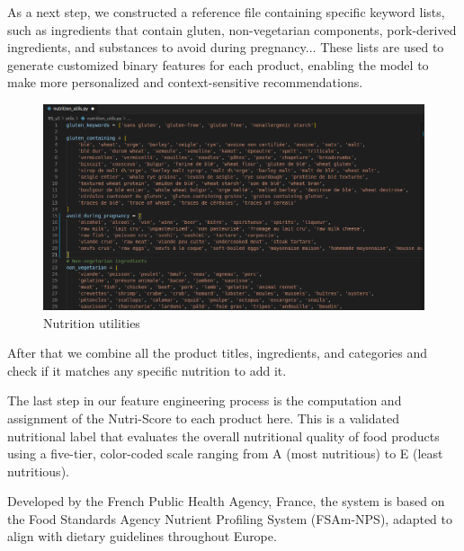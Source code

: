 As a next step, we constructed a reference file containing specific keyword lists, such as ingredients that contain gluten, non-vegetarian components, pork-derived ingredients, and substances to avoid during pregnancy... 
These lists are used to generate customized binary features for each product, enabling the model to make more personalized and context-sensitive recommendations.
\begin{center}
\begin{figure}[H]
    \includegraphics[scale=0.35]{images/nutrition_utils.png}
    \caption{Nutrition utilities} 
    \label{fig:nutrition_utils_file}
\end{figure}
\end{center}

After that we combine all the product titles, ingredients, and categories and check if it matches any specific nutrition to add it.


The last step in our feature engineering process is the computation and assignment of the Nutri-Score to each product here. This is a validated nutritional label that evaluates the overall nutritional quality of food products using a five-tier, color-coded scale ranging from A (most nutritious) to E (least nutritious)\cite{egnell2022impact}.

 Developed by the French Public Health Agency, France, the system is based on the Food Standards Agency Nutrient Profiling System (FSAm-NPS), adapted to align with dietary guidelines throughout Europe.

